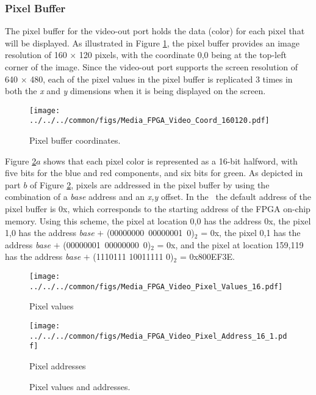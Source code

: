\subsubsection{Pixel Buffer}
\label{sec:pixel_buffer}

The pixel buffer for the video-out port holds the data (color) for each pixel that
will be displayed.  As illustrated in Figure \ref{fig:video_coord}, the
pixel buffer provides an image resolution of 
160 $\times$ 120 pixels, with the coordinate 0,0 being at the top-left corner of the image. 
Since the video-out port supports the screen resolution of 640 $\times$ 480, each of the
pixel values in
the pixel buffer is replicated 3 times in both the {\it x} and {\it y} dimensions when it is being
displayed on the screen.

\begin{figure}[h!]
   \begin{center}
       \texttt{[image: ../../../common/figs/Media\_FPGA\_Video\_Coord\_160120.pdf]}
   \end{center}
   \caption{Pixel buffer coordinates.}
	\label{fig:video_coord}
\end{figure}

Figure \ref{fig:pixels}$a$ shows that each pixel color is represented as a 16-bit halfword, 
with five bits for the blue and red 
components, and six bits for green.  As depicted in part $b$ of Figure \ref{fig:pixels}, 
pixels are addressed in the pixel buffer by 
using the combination of a {\it base} address and an {\it x,y} offset.  In the \systemName~the default
address of the pixel buffer is {\sf 0x}, which corresponds
to the starting address of the FPGA on-chip memory.  Using this scheme, the pixel at 
location 0,0 has the address {\sf 0x}, 
the pixel 1,0 has the address {\it base} $+$ (00000000~00000001~0)$_2$ = {\sf 0x}, 
the pixel 0,1 has the address {\it base} $+$ (00000001~00000000~0)$_2$ = {\sf 0x},
and the pixel at location 159,119 has the address {\it base} $+$ (1110111 10011111 0)$_2$ = 
{\sf 0x\baseAddressOffset 800EF3E}. 

\begin{figure}[h!]
   \begin{center}
       \texttt{[image: ../../../common/figs/Media\_FPGA\_Video\_Pixel\_Values\_16.pdf]}
			 \caption*{Pixel values}
			 \vspace{1cm}
			 \texttt{[image: ../../../common/figs/Media\_FPGA\_Video\_Pixel\_Address\_16\_1.pdf]}
			 \caption*{Pixel addresses}
   \end{center}
   \caption{Pixel values and addresses.}
	\label{fig:pixels}
\end{figure}

